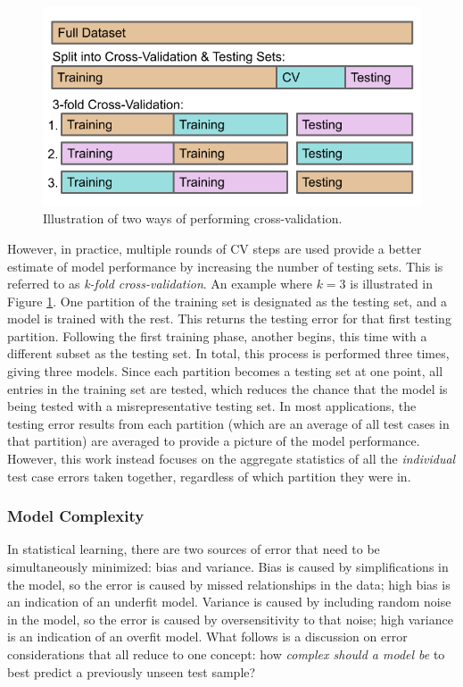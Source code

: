 \begin{figure}[!htb]
  \centering
  \includegraphics[width=0.85\linewidth]{./chapters/litrev/cverror.png}
  \caption{Illustration of two ways of performing cross-validation.}
  \label{fig:cverror}
\end{figure}

However, in practice, multiple rounds of \gls{CV} steps are used provide a
better estimate of model performance by increasing the number of testing sets.
This is referred to as \textit{k-fold cross-validation}.  An example where
$k=3$ is illustrated in Figure \ref{fig:cverror}.  One partition of the
training set is designated as the testing set, and a model is trained with the
rest. This returns the testing error for that first testing partition.
Following the first training phase, another begins, this time with a different
subset as the testing set.  In total, this process is performed three times,
giving three models. Since each partition becomes a testing set at one point,
all entries in the training set are tested, which reduces the chance that the
model is being tested with a misrepresentative testing set. In most
applications, the testing error results from each partition (which are an
average of all test cases in that partition) are averaged to provide a picture
of the model performance. However, this work instead focuses on the aggregate
statistics of all the \textit{individual} test case errors taken together,
regardless of which partition they were in.

\subsubsection{Model Complexity}
\label{sec:complexity}

In statistical learning, there are two sources of error that need to be
simultaneously minimized: bias and variance. Bias is caused by simplifications
in the model, so the error is caused by missed relationships in the data; high
bias is an indication of an underfit model.  Variance is caused by including
random noise in the model, so the error is caused by oversensitivity to that
noise; high variance is an indication of an overfit model. What follows is a
discussion on error considerations that all reduce to one concept: how
\textit{complex should a model be} to best predict a previously unseen test
sample?

